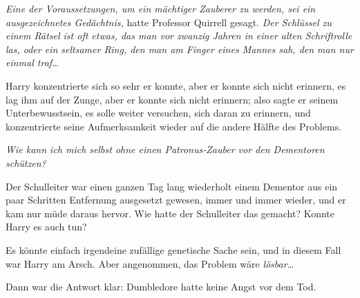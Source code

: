 \emph{Eine der Voraussetzungen, um ein mächtiger Zauberer zu werden, sei ein ausgezeichnetes Gedächtnis,} hatte Professor Quirrell gesagt. \emph{Der Schlüssel zu einem Rätsel ist oft etwas, das man vor zwanzig Jahren in einer alten Schriftrolle las, oder ein seltsamer Ring, den man am Finger eines Mannes sah, den man nur einmal traf…}

Harry konzentrierte sich so sehr er konnte, aber er konnte sich nicht erinnern, es lag ihm auf der Zunge, aber er konnte sich nicht erinnern; also sagte er seinem Unterbewusstsein, es solle weiter versuchen, sich daran zu erinnern, und konzentrierte seine Aufmerksamkeit wieder auf die andere Hälfte des Problems.

\emph{Wie kann ich mich selbst ohne einen Patronus-Zauber vor den Dementoren schützen?}

Der Schulleiter war einen ganzen Tag lang wiederholt einem Dementor aus ein paar Schritten Entfernung ausgesetzt gewesen, immer und immer wieder, und er kam nur müde daraus hervor. Wie hatte der Schulleiter das gemacht? Konnte Harry es auch tun?

Es könnte einfach irgendeine zufällige genetische Sache sein, und in diesem Fall war Harry am Arsch. Aber angenommen, das Problem wäre \emph{lösbar}…

Dann war die Antwort klar: Dumbledore hatte keine Angst vor dem Tod.

